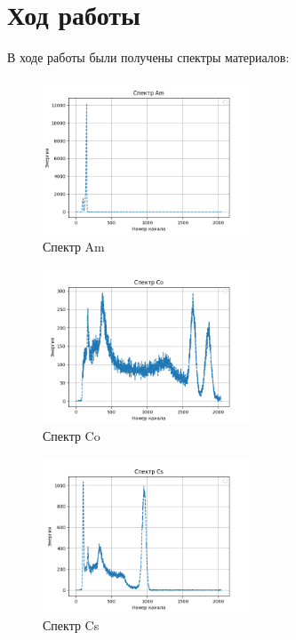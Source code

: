 \documentclass[a4paper,12pt]{article} %
\begin{document}
	\section{Ход работы}
		В ходе работы были получены спектры материалов:
		\begin{figure}[h!]
      \includegraphics[width=0.55\textwidth]{img/Am.png}
      \centering
      \caption{Спектр Am}
    \end{figure}\par
		\begin{figure}[h!]
      \includegraphics[width=0.55\textwidth]{img/Co.png}
      \centering
      \caption{Спектр Co}
    \end{figure}\par
		\begin{figure}[h!]
      \includegraphics[width=0.55\textwidth]{img/Cs.png}
      \centering
      \caption{Спектр Cs}
    \end{figure}\par
\end{document}
